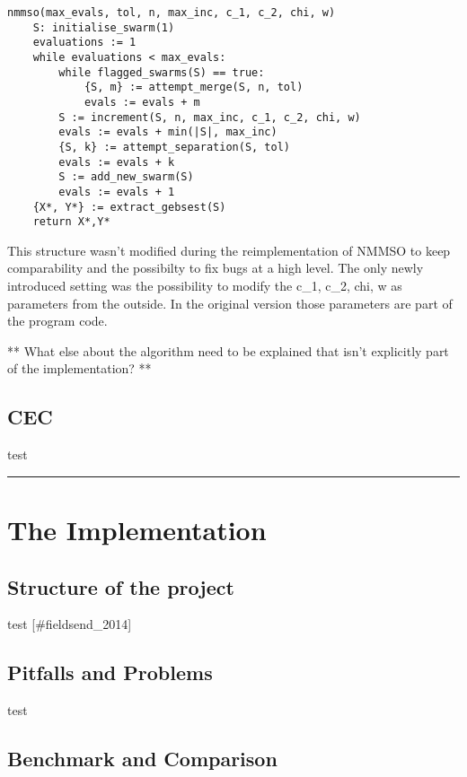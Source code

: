 \documentclass[12pt,a4paper]{article}
\begin{document}
\begin{verbatim}
nmmso(max_evals, tol, n, max_inc, c_1, c_2, chi, w)
    S: initialise_swarm(1)
    evaluations := 1
    while evaluations < max_evals:
        while flagged_swarms(S) == true:
            {S, m} := attempt_merge(S, n, tol)
            evals := evals + m
        S := increment(S, n, max_inc, c_1, c_2, chi, w)
        evals := evals + min(|S|, max_inc)
        {S, k} := attempt_separation(S, tol)
        evals := evals + k
        S := add_new_swarm(S)
        evals := evals + 1
    {X*, Y*} := extract_gebsest(S)
    return X*,Y*
\end{verbatim}

This structure wasn't modified during the reimplementation of NMMSO to
keep comparability and the possibilty to fix bugs at a high level. The
only newly introduced setting was the possibility to modify the c\_1,
c\_2, chi, w as parameters from the outside. In the original version
those parameters are part of the program code.

** What else about the algorithm need to be explained that isn't
explicitly part of the implementation? **

\subsection{CEC}\label{cec}

test

\begin{center}\rule{0.5\linewidth}{\linethickness}\end{center}

\section{The Implementation}\label{the-implementation}

\subsection{Structure of the project}\label{structure-of-the-project}

test {[}\#fieldsend\_2014{]}

\subsection{Pitfalls and Problems}\label{pitfalls-and-problems}

test

\subsection{Benchmark and Comparison}\label{benchmark-and-comparison}
\end{document}
